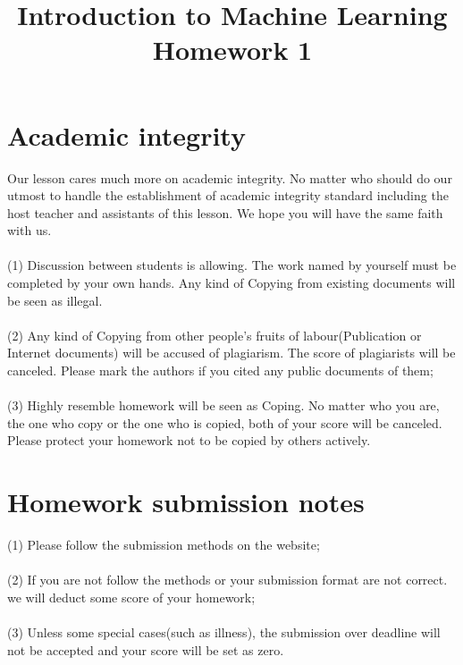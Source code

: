\documentclass{article}
\title{Introduction to Machine Learning\\Homework 1}
\begin{document}
	\maketitle
	\section*{Academic integrity}
	Our lesson cares much more on academic integrity. No matter who should do our utmost to handle the establishment of academic integrity standard including the host teacher and assistants of this lesson. We hope you will have the same faith with us.\\ \\ 
	(1) Discussion between students is allowing. The work named by yourself must be completed by your own hands. Any kind of Copying from existing documents will be seen as illegal.\\ \\
	(2) Any kind of Copying from other people's fruits of labour(Publication or Internet documents) will be accused of plagiarism. The score of plagiarists will be canceled. Please mark the authors if you cited any public documents of them;\\ \\
	(3) Highly resemble homework will be seen as Coping. No matter who you are, the one who copy or the one who is copied, both of your score will be canceled. Please protect your homework not to be copied by others actively.
	\section*{Homework submission notes}
	(1) Please follow the submission methods on the website;\\ \\ 
	(2) If you are not follow the methods or your submission format are not correct. we will deduct some score of your homework;\\ \\ 
	(3) Unless some special cases(such as illness), the submission over deadline will not be accepted and your score will be set as zero. 
	\newpage
\end{document}

